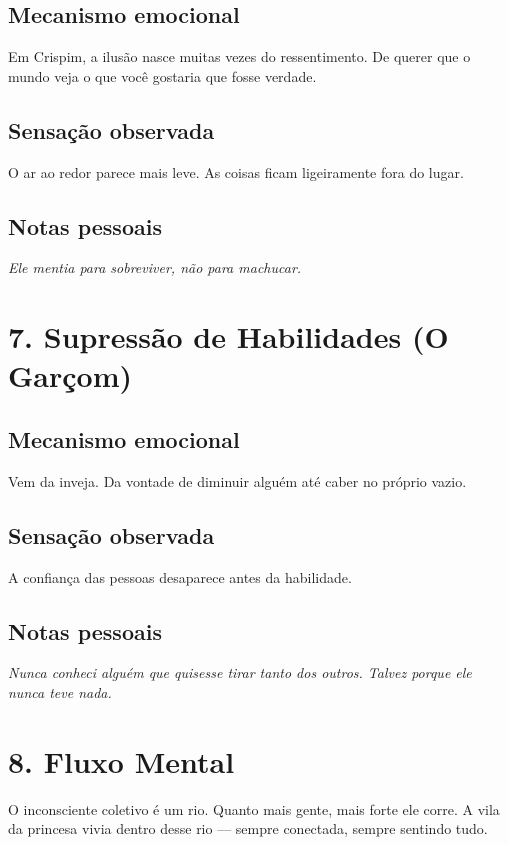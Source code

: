 \subsection*{Mecanismo emocional}
Em Crispim, a ilusão nasce muitas vezes do ressentimento.
De querer que o mundo veja o que você gostaria que fosse verdade.

\subsection*{Sensação observada}
O ar ao redor parece mais leve.  
As coisas ficam ligeiramente fora do lugar.

\subsection*{Notas pessoais}
\textit{Ele mentia para sobreviver, não para machucar.}

\section*{7. Supressão de Habilidades (O Garçom)}

\subsection*{Mecanismo emocional}
Vem da inveja.  
Da vontade de diminuir alguém até caber no próprio vazio.

\subsection*{Sensação observada}
A confiança das pessoas desaparece antes da habilidade.

\subsection*{Notas pessoais}
\textit{Nunca conheci alguém que quisesse tirar tanto dos outros.  
Talvez porque ele nunca teve nada.}

\section*{8. Fluxo Mental}

O inconsciente coletivo é um rio.  
Quanto mais gente, mais forte ele corre.  
A vila da princesa vivia dentro desse rio — sempre conectada, sempre sentindo tudo.

